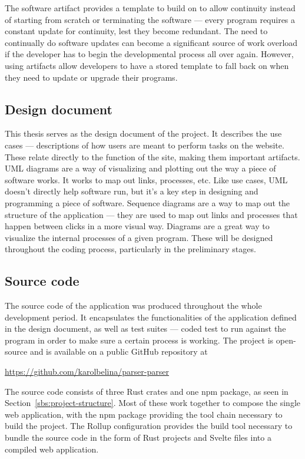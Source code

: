 \documentclass[english,bachelors,forcepolishlogotype]{wizthesis}
\begin{document}
The software artifact provides a template to build on to allow continuity
instead of starting from scratch or terminating the software --- every program
requires a constant update for continuity, lest they become redundant. The need
to continually do software updates can become a significant source of work
overload if the developer has to begin the developmental process all over again.
However, using artifacts allow developers to have a stored template to fall back
on when they need to update or upgrade their programs.

\subsection*{Design document}

This thesis serves as the design document of the project. It describes the use
cases --- descriptions of how users are meant to perform tasks on the website.
These relate directly to the function of the site, making them important
artifacts. UML diagrams are a way of visualizing and plotting out the way a
piece of software works. It works to map out links, processes, etc. Like use
cases, UML doesn't directly help software run, but it's a key step in designing
and programming a piece of software. Sequence diagrams are a way to map out the
structure of the application --- they are used to map out links and processes
that happen between clicks in a more visual way. Diagrams are a great way to
visualize the internal processes of a given program. These will be designed
throughout the coding process, particularly in the preliminary stages.

\subsection*{Source code}

The source code of the application was produced throughout the whole development
period. It encapsulates the functionalities of the application defined in the
design document, as well as test suites --- coded test to run against the
program in order to make sure a certain process is working. The project is
open-source and is available on a public GitHub repository at
\begin{center}
  \url{https://github.com/karolbelina/parser-parser}
\end{center}

The source code consists of three Rust crates and one npm package, as seen in
Section~\ref{sbs:project-structure}. Most of these work together to compose the
single web application, with the npm package providing the tool chain necessary
to build the project. The Rollup configuration provides the build tool necessary
to bundle the source code in the form of Rust projects and Svelte files into a
compiled web application.
\end{document}
